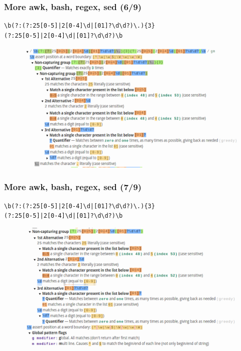 \documentclass[aspectratio=169, xcolor=table, notheorems, hyperref={pdfpagelabels=false}]{beamer}
\begin{document}
\begin{frame}[fragile]
\frametitle{More awk, bash, regex, sed (6/9)}

\begin{verbatim}
\b(?:(?:25[0-5]|2[0-4]\d|[01]?\d\d?)\.){3}
(?:25[0-5]|2[0-4]\d|[01]?\d\d?)\b
\end{verbatim}

\begin{figure}
\includegraphics[width=0.69\linewidth]{os-regex1}
\end{figure}
\end{frame}

\begin{frame}[fragile]
\frametitle{More awk, bash, regex, sed (7/9)}

\begin{verbatim}
\b(?:(?:25[0-5]|2[0-4]\d|[01]?\d\d?)\.){3}
(?:25[0-5]|2[0-4]\d|[01]?\d\d?)\b
\end{verbatim}

\begin{figure}
\includegraphics[width=0.69\linewidth]{os-regex2}
\end{figure}
\end{frame}
\end{document}
